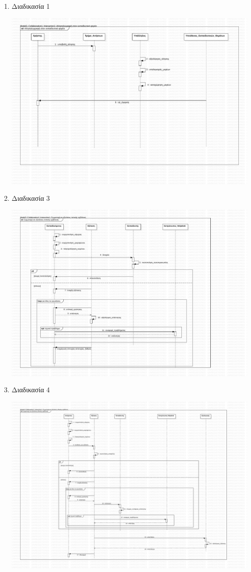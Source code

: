 \documentclass[a4paper, titlepage, twoside]{article}
\begin{document}
\begin{enumerate}
\item Διαδικασία 1
\label{sec:orgc1bc986}
\begin{center}
\includegraphics[width=.9\linewidth]{seq_1.pdf}
\end{center}
\item Διαδικασία 3
\label{sec:org3de980b}
\begin{center}
\includegraphics[width=.9\linewidth]{seq_3.pdf}
\end{center}
\item Διαδικασία 4
\label{sec:org56cfad9}
\begin{center}
\includegraphics[width=.9\linewidth]{seq_4.pdf}
\end{center}
\end{enumerate}
\end{document}
